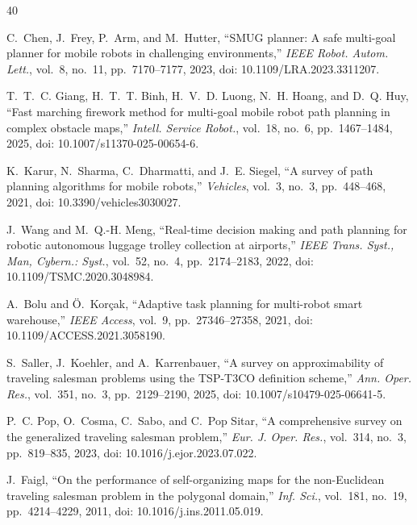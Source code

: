 \begin{thebibliography}{40}

C.~Chen, J.~Frey, P.~Arm, and M.~Hutter, ``SMUG planner: A safe multi-goal planner for mobile robots in challenging environments,'' \textit{IEEE Robot. Autom. Lett.}, vol.~8, no.~11, pp.~7170--7177, 2023, doi: 10.1109/LRA.2023.3311207.



T.~T.~C. Giang, H.~T.~T. Binh, H.~V.~D. Luong, N.~H. Hoang, and D.~Q. Huy, ``Fast marching firework method for multi-goal mobile robot path planning in complex obstacle maps,'' \textit{Intell. Service Robot.}, vol.~18, no.~6, pp.~1467--1484, 2025, doi: 10.1007/s11370-025-00654-6.



K.~Karur, N.~Sharma, C.~Dharmatti, and J.~E. Siegel, ``A survey of path planning algorithms for mobile robots,'' \textit{Vehicles}, vol.~3, no.~3, pp.~448--468, 2021, doi: 10.3390/vehicles3030027.



J.~Wang and M.~Q.-H. Meng, ``Real-time decision making and path planning for robotic autonomous luggage trolley collection at airports,'' \textit{IEEE Trans. Syst., Man, Cybern.: Syst.}, vol.~52, no.~4, pp.~2174--2183, 2022, doi: 10.1109/TSMC.2020.3048984.



A.~Bolu and \"O.~Kor\c{c}ak, ``Adaptive task planning for multi-robot smart warehouse,'' \textit{IEEE Access}, vol.~9, pp.~27346--27358, 2021, doi: 10.1109/ACCESS.2021.3058190.



S.~Saller, J.~Koehler, and A.~Karrenbauer, ``A survey on approximability of traveling salesman problems using the TSP-T3CO definition scheme,'' \textit{Ann. Oper. Res.}, vol.~351, no.~3, pp.~2129--2190, 2025, doi: 10.1007/s10479-025-06641-5.



P.~C. Pop, O.~Cosma, C.~Sabo, and C.~Pop Sitar, ``A comprehensive survey on the generalized traveling salesman problem,'' \textit{Eur. J. Oper. Res.}, vol.~314, no.~3, pp.~819--835, 2023, doi: 10.1016/j.ejor.2023.07.022.



J.~Faigl, ``On the performance of self-organizing maps for the non-Euclidean traveling salesman problem in the polygonal domain,'' \textit{Inf. Sci.}, vol.~181, no.~19, pp.~4214--4229, 2011, doi: 10.1016/j.ins.2011.05.019.



\end{thebibliography}
